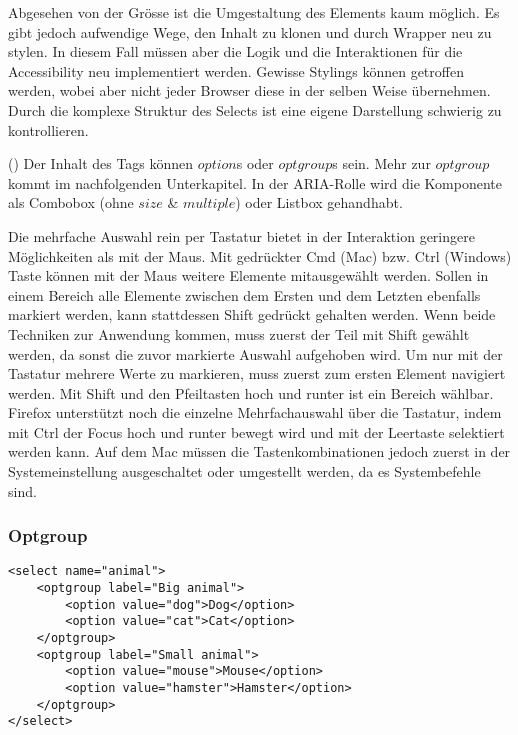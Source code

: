 Abgesehen von der Grösse ist die Umgestaltung des Elements kaum möglich.
Es gibt jedoch aufwendige Wege, den Inhalt zu klonen und durch Wrapper neu zu stylen.
In diesem Fall müssen aber die Logik und die Interaktionen für die Accessibility neu implementiert werden.
Gewisse Stylings können getroffen werden, wobei aber nicht jeder Browser diese in der selben Weise übernehmen.
Durch die komplexe Struktur des Selects ist eine eigene Darstellung schwierig zu kontrollieren.

(\cite{selectMdn}) Der Inhalt des Tags können $option$s oder $optgroup$s sein.
Mehr zur $optgroup$ kommt im nachfolgenden Unterkapitel.
In der ARIA-Rolle wird die Komponente als Combobox (ohne $size$ \& $multiple$) oder Listbox gehandhabt.

Die mehrfache Auswahl rein per Tastatur bietet in der Interaktion geringere Möglichkeiten als mit der Maus.
Mit gedrückter Cmd (Mac) bzw. Ctrl (Windows) Taste können mit der Maus weitere Elemente mitausgewählt werden.
Sollen in einem Bereich alle Elemente zwischen dem Ersten und dem Letzten ebenfalls markiert werden, kann stattdessen Shift gedrückt gehalten werden.
Wenn beide Techniken zur Anwendung kommen, muss zuerst der Teil mit Shift gewählt werden, da sonst die zuvor markierte Auswahl aufgehoben wird.
Um nur mit der Tastatur mehrere Werte zu markieren, muss zuerst zum ersten Element navigiert werden.
Mit Shift und den Pfeiltasten hoch und runter ist ein Bereich wählbar.
Firefox unterstützt noch die einzelne Mehrfachauswahl über die Tastatur, indem mit Ctrl der Focus hoch und runter bewegt wird und mit der Leertaste selektiert werden kann.
Auf dem Mac müssen die Tastenkombinationen jedoch zuerst in der Systemeinstellung ausgeschaltet oder umgestellt werden, da es Systembefehle sind.


\subsubsection{\color{dgray} Optgroup}

\begin{lstlisting}[style = htmlcssjs, caption = Optgroup Example, label = code:OptgroupExample]
<select name="animal">
    <optgroup label="Big animal">
        <option value="dog">Dog</option>
        <option value="cat">Cat</option>
    </optgroup>
    <optgroup label="Small animal">
        <option value="mouse">Mouse</option>
        <option value="hamster">Hamster</option>
    </optgroup>
</select>
\end{lstlisting}

